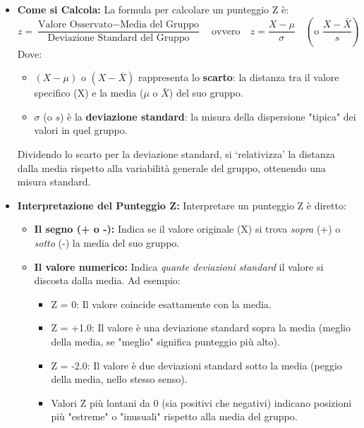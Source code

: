 \documentclass[12pt, a4paper]{article}
\begin{document}
\begin{itemize}
    \item \textbf{Come si Calcola:} La formula per calcolare un punteggio Z è:
        \begin{equation*}
            z = \frac{\text{Valore Osservato} - \text{Media del Gruppo}}{\text{Deviazione Standard del Gruppo}} \quad \text{ovvero} \quad z = \frac{X - \mu}{\sigma} \quad (\text{o } \frac{X - \bar{X}}{s})
        \end{equation*}
        Dove:
        \begin{itemize}
            \item $(X - \mu)$ o $(X - \bar{X})$ rappresenta lo \textbf{scarto}: la distanza tra il valore specifico (X) e la media ($\mu$ o $\bar{X}$) del suo gruppo.
            \item $\sigma$ (o $s$) è la \textbf{deviazione standard}: la misura della dispersione "tipica" dei valori in quel gruppo.
        \end{itemize}
        Dividendo lo scarto per la deviazione standard, si `relativizza' la distanza dalla media rispetto alla variabilità generale del gruppo, ottenendo una misura standard.

    \item \textbf{Interpretazione del Punteggio Z:} Interpretare un punteggio Z è diretto:
        \begin{itemize}
            \item \textbf{Il segno (+ o -):} Indica se il valore originale (X) si trova \textit{sopra} (+) o \textit{sotto} (-) la media del suo gruppo.
            \item \textbf{Il valore numerico:} Indica \textit{quante deviazioni standard} il valore si discosta dalla media. Ad esempio:
                \begin{itemize}
                    \item Z = 0: Il valore coincide esattamente con la media.
                    \item Z = +1.0: Il valore è una deviazione standard sopra la media (meglio della media, se "meglio" significa punteggio più alto).
                    \item Z = -2.0: Il valore è due deviazioni standard sotto la media (peggio della media, nello stesso senso).
                    \item Valori Z più lontani da 0 (sia positivi che negativi) indicano posizioni più "estreme" o "inusuali" rispetto alla media del gruppo.
                \end{itemize}
        \end{itemize}


\end{itemize}
\end{document}
